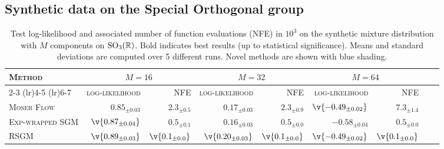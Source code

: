 \subsection{Synthetic data on the Special Orthogonal group}
\label{sec:exp_so3}
\begin{table}[t!]
	\centering
	\small
	\begin{tabular}{lrrrrrrrr}
		\toprule
		\multirow{2}{4.5em}{\scshape Method} & \multicolumn{2}{c}{\(M=16\)}                & \multicolumn{2}{c}{\(M=32\)}              & \multicolumn{2}{c}{\(M=64\)}                                                                                                                                                  \\ \cmidrule(lr){2-3} \cmidrule(lr){4-5} \cmidrule(lr){6-7}
		                            & \scshape log-likelihood                            & \scshape NFE                                     & \scshape log-likelihood                            & \scshape NFE                                      & \scshape log-likelihood                             & \scshape NFE                                     \\

		\midrule

		\scshape Moser Flow                  & \({0.85_{\pm 0.03}}\)                       & \({2.3_{\pm 0.5}}\)                       & \({0.17_{\pm 0.03}}\)                       & \({2.3_{\pm 0.9}}\)                        & \(\v{-0.49_{\pm 0.02}}\)                     & \({7.3_{\pm 1.4}}\)                       \\  \rowcolor{pearDark!20} \scshape Exp-wrapped SGM           &  \(\v{0.87_{\pm 0.04}}\)   &   \({0.5_{\pm 0.1}}\)     &   \({0.16_{\pm 0.03}}\) &   \({0.5_{\pm 0.0}}\)     &  \({-0.58_{\pm 0.04}}\) &   \({0.5_{\pm 0.0}}\)                                                \\
		\rowcolor{pearDark!20} \scshape RSGM                        &   \(\v{0.89_{\pm 0.03}}\) &   \(\v{0.1_{\pm 0.0}}\) &   \(\v{0.20_{\pm 0.03}}\) &   \(\v{0.1_{\pm 0.0}}\)  &   \(\v{-0.49_{\pm 0.02}}\) &   \(\v{0.1_{\pm 0.0}}\) \\

		\bottomrule
	\end{tabular}
	\caption{
		Test log-likelihood and associated number of function evaluations (NFE) in \(10^3\) on the synthetic mixture distribution with \(M\) components on \(\mathrm{SO}_3(\mathbb{R})\).
		Bold indicates best results (up to statistical significance).
		Means and standard deviations are computed over 5 different runs.
		Novel methods are shown with blue shading.
	}
	\label{tab:so3}
\end{table}
